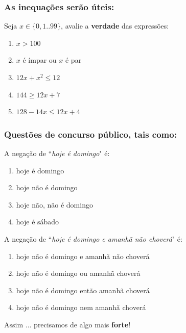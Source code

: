 \documentclass{beamer}
\begin{document}
\begin{frame}
\frametitle{As inequações serão úteis:}

\begin{exampleblock}
{Seja $x \in \{0,1..99\}$, avalie a \textbf{verdade} das expressões:}
\begin{enumerate}
  
  \item $ x > 100$
  
  \item $x$ é ímpar ou $x$ é par
  
  \item $12x + x^2 \le 12$

  \item $144 \ge 12x + 7$

  \item $128 - 14x \le 12x + 4$
      
\end{enumerate}
\end{exampleblock}
\end{frame}




\begin{frame}
\frametitle{Questões de concurso público, tais como:}

\begin{exampleblock}{A negação de ``\textit{hoje é domingo}"\/ é:}
\begin{enumerate}
  \item hoje é domingo
  \item hoje não é domingo
  \item hoje não, não é domingo
  \item hoje é sábado
\end{enumerate}
\end{exampleblock}

\pause
\begin{block}{A negação de ``\textit{hoje é domingo e amanhã não choverá}"\/ é:}
\begin{enumerate}
  \item hoje não é domingo e amanhã não choverá
  \item hoje não é domingo ou amanhã choverá
  \item hoje não é domingo então amanhã choverá
  \item hoje não é domingo nem amanhã choverá
\end{enumerate}
\end{block}
\pause
\begin{alertblock}{Assim ...}
precisamos de algo mais \textbf{forte}!
\end{alertblock}
\end{frame}
\end{document}

